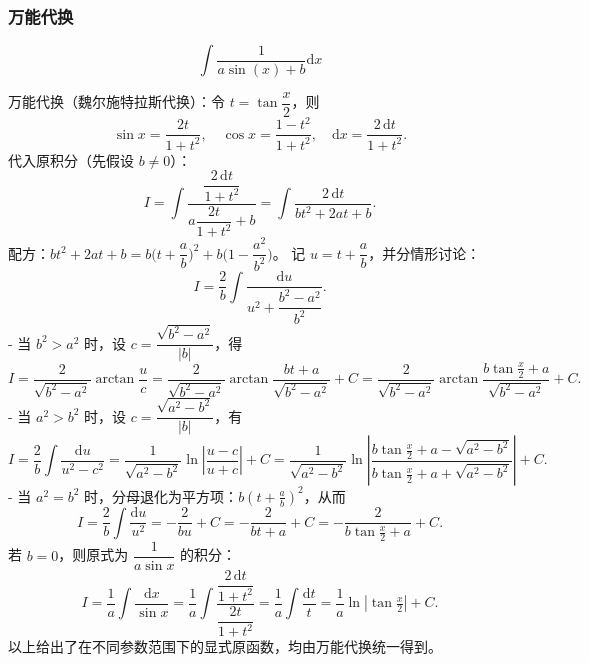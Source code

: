 \documentclass[lang=cn,newtx,10pt,scheme=chinese]{elegantbook}
\begin{document}
    \subsubsection{万能代换}
    \begin{example}
      \begin{equation}
        \int \frac{1}{a \sin(x)+b} \mathrm{d}x
      \end{equation}
      \begin{solution}
        万能代换（魏尔施特拉斯代换）：令 $t=\tan\dfrac{x}{2}$，则
        \[
          \sin x = \frac{2t}{1+t^{2}},\quad \cos x = \frac{1-t^{2}}{1+t^{2}},\quad \mathrm{d}x = \frac{2\,\mathrm{d}t}{1+t^{2}}.
        \]
        代入原积分（先假设 $b\ne 0$）：
        \[
          I 
          = \int \frac{ \dfrac{2\,\mathrm{d}t}{1+t^{2}} }{ a\dfrac{2t}{1+t^{2}} + b }
          = \int \frac{2\,\mathrm{d}t}{ b t^{2} + 2 a t + b }.
        \]
        配方：$b t^{2} + 2 a t + b = b\Big( t+\dfrac{a}{b} \Big)^{2} + b\Big(1-\dfrac{a^{2}}{b^{2}}\Big)$。
        记 $u=t+\dfrac{a}{b}$，并分情形讨论：
        \[
          I = \frac{2}{b} \int \frac{\mathrm{d}u}{u^{2} + \dfrac{b^{2}-a^{2}}{b^{2}}}.
        \]
        - 当 $b^{2}>a^{2}$ 时，设 $c=\dfrac{\sqrt{b^{2}-a^{2}}}{|b|}$，得
        \[
          I = \frac{2}{\sqrt{b^{2}-a^{2}}} \arctan\!\frac{u}{c}
          = \frac{2}{\sqrt{b^{2}-a^{2}}}\arctan\!\frac{b t + a}{\sqrt{b^{2}-a^{2}}} + C
          = \frac{2}{\sqrt{b^{2}-a^{2}}}\arctan\!\frac{b\tan\tfrac{x}{2} + a}{\sqrt{b^{2}-a^{2}}} + C.
        \]
        - 当 $a^{2}>b^{2}$ 时，设 $c=\dfrac{\sqrt{a^{2}-b^{2}}}{|b|}$，有
        \[
          I = \frac{2}{b} \int \frac{\mathrm{d}u}{u^{2}-c^{2}}
            = \frac{1}{\sqrt{a^{2}-b^{2}}}
              \ln\left|\frac{u-c}{u+c}\right| + C
            = \frac{1}{\sqrt{a^{2}-b^{2}}}
              \ln\left|\frac{b\tan\tfrac{x}{2}+a-\sqrt{a^{2}-b^{2}}}{b\tan\tfrac{x}{2}+a+\sqrt{a^{2}-b^{2}}}\right| + C.
        \]
        - 当 $a^{2}=b^{2}$ 时，分母退化为平方项：$b(t+\tfrac{a}{b})^{2}$，从而
        \[
          I = \frac{2}{b} \int \frac{\mathrm{d}u}{u^{2}} = -\frac{2}{b u} + C = -\frac{2}{b t + a} + C = -\frac{2}{b\tan\tfrac{x}{2} + a} + C.
        \]
        若 $b=0$，则原式为 $\dfrac{1}{a\sin x}$ 的积分：
        \[
          I = \frac{1}{a}\int \frac{\mathrm{d}x}{\sin x}
            = \frac{1}{a}\int \frac{ \dfrac{2\,\mathrm{d}t}{1+t^{2}} }{ \dfrac{2t}{1+t^{2}} }
            = \frac{1}{a}\int \frac{\mathrm{d}t}{t}
            = \frac{1}{a}\ln|\tan\tfrac{x}{2}| + C.
        \]
        以上给出了在不同参数范围下的显式原函数，均由万能代换统一得到。
      \end{solution}
    \end{example}
\end{document}
